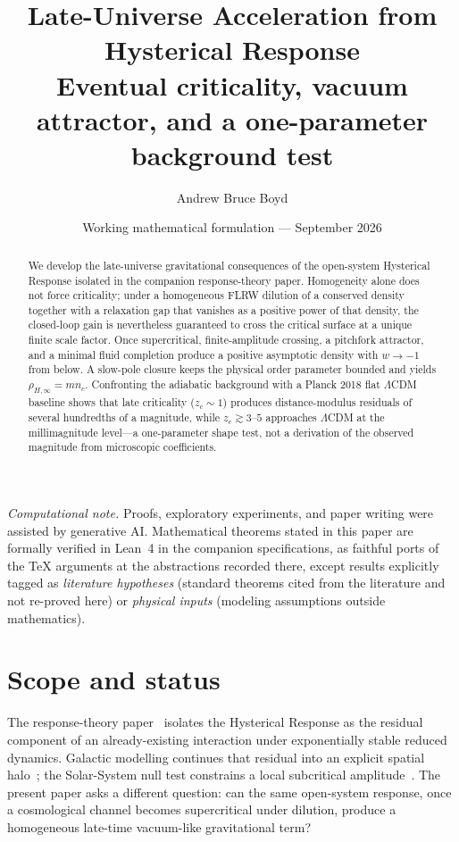 \documentclass[11pt]{article}
\title{\textbf{Late-Universe Acceleration from Hysterical Response}\\[0.35em]
\large Eventual criticality, vacuum attractor, and a one-parameter background test}
\author{Andrew Bruce Boyd}
\date{Working mathematical formulation --- September 2026}
\theoremstyle{definition}
\theoremstyle{remark}
\begin{document}
\maketitle
\noindent\textit{Computational note.}
Proofs, exploratory experiments, and paper writing were assisted by generative AI.
Mathematical theorems stated in this paper are formally verified in Lean~4 in the
companion specifications, as faithful ports of the TeX arguments at the abstractions
recorded there, except results explicitly tagged as \emph{literature hypotheses}
(standard theorems cited from the literature and not re-proved here) or
\emph{physical inputs} (modeling assumptions outside mathematics).

\begin{abstract}
We develop the late-universe gravitational consequences of the open-system Hysterical Response isolated in the companion response-theory paper.
Homogeneity alone does not force criticality; under a homogeneous FLRW dilution of a conserved density together with a relaxation gap that vanishes as a positive power of that density, the closed-loop gain is nevertheless guaranteed to cross the critical surface at a unique finite scale factor.
Once supercritical, finite-amplitude crossing, a pitchfork attractor, and a minimal fluid completion produce a positive asymptotic density with $w\to-1$ from below.
A slow-pole closure keeps the physical order parameter bounded and yields $\rho_{H,\infty}=m n_c$.
Confronting the adiabatic background with a Planck 2018 flat $\Lambda$CDM baseline shows that late criticality ($z_c\sim1$) produces distance-modulus residuals of several hundredths of a magnitude, while $z_c\gtrsim3$--$5$ approaches $\Lambda$CDM at the millimagnitude level---a one-parameter shape test, not a derivation of the observed magnitude from microscopic coefficients.
\end{abstract}
\tableofcontents
\newpage

\section{Scope and status}
\label{sec:scope}
The response-theory paper~\cite{boyd2026response} isolates the Hysterical Response as the residual component of an already-existing interaction under exponentially stable reduced dynamics.
Galactic modelling continues that residual into an explicit spatial halo~\cite{boyd2026galactic}; the Solar-System null test constrains a local subcritical amplitude~\cite{boyd2026solar}.
The present paper asks a different question: can the same open-system response, once a cosmological channel becomes supercritical under dilution, produce a homogeneous late-time vacuum-like gravitational term?
\end{document}
